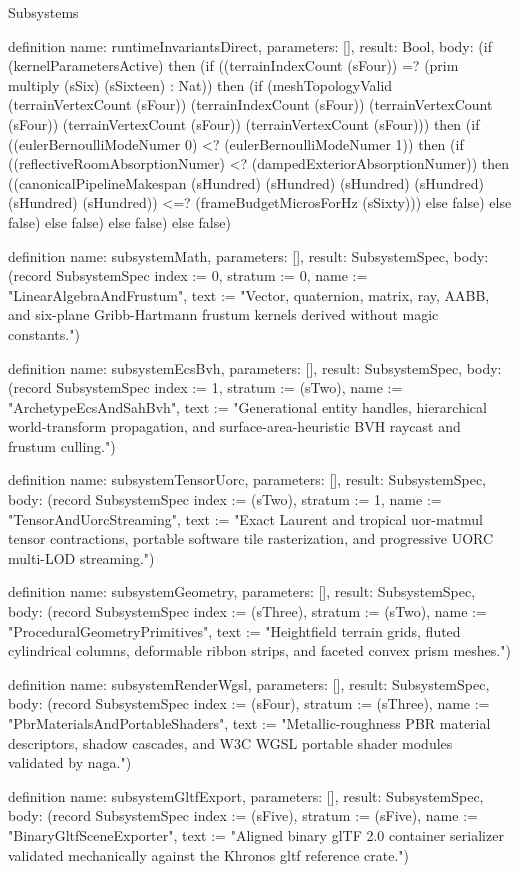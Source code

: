 \begin{lexlean}{Subsystems}
\begin{semanticmodule}
definition{
  name: runtimeInvariantsDirect,
  parameters: [],
  result: Bool,
  body: (if (kernelParametersActive) then (if ((terrainIndexCount (sFour)) =? (prim multiply (sSix) (sSixteen) : Nat)) then (if (meshTopologyValid (terrainVertexCount (sFour)) (terrainIndexCount (sFour)) (terrainVertexCount (sFour)) (terrainVertexCount (sFour)) (terrainVertexCount (sFour))) then (if ((eulerBernoulliModeNumer 0) <? (eulerBernoulliModeNumer 1)) then (if ((reflectiveRoomAbsorptionNumer) <? (dampedExteriorAbsorptionNumer)) then ((canonicalPipelineMakespan (sHundred) (sHundred) (sHundred) (sHundred) (sHundred) (sHundred)) <=? (frameBudgetMicrosForHz (sSixty))) else false) else false) else false) else false) else false)
}

definition{
  name: subsystemMath,
  parameters: [],
  result: SubsystemSpec,
  body: (record SubsystemSpec {index := 0, stratum := 0, name := "LinearAlgebraAndFrustum", text := "Vector, quaternion, matrix, ray, AABB, and six-plane Gribb-Hartmann frustum kernels derived without magic constants."})
}

definition{
  name: subsystemEcsBvh,
  parameters: [],
  result: SubsystemSpec,
  body: (record SubsystemSpec {index := 1, stratum := (sTwo), name := "ArchetypeEcsAndSahBvh", text := "Generational entity handles, hierarchical world-transform propagation, and surface-area-heuristic BVH raycast and frustum culling."})
}

definition{
  name: subsystemTensorUorc,
  parameters: [],
  result: SubsystemSpec,
  body: (record SubsystemSpec {index := (sTwo), stratum := 1, name := "TensorAndUorcStreaming", text := "Exact Laurent and tropical uor-matmul tensor contractions, portable software tile rasterization, and progressive UORC multi-LOD streaming."})
}

definition{
  name: subsystemGeometry,
  parameters: [],
  result: SubsystemSpec,
  body: (record SubsystemSpec {index := (sThree), stratum := (sTwo), name := "ProceduralGeometryPrimitives", text := "Heightfield terrain grids, fluted cylindrical columns, deformable ribbon strips, and faceted convex prism meshes."})
}

definition{
  name: subsystemRenderWgsl,
  parameters: [],
  result: SubsystemSpec,
  body: (record SubsystemSpec {index := (sFour), stratum := (sThree), name := "PbrMaterialsAndPortableShaders", text := "Metallic-roughness PBR material descriptors, shadow cascades, and W3C WGSL portable shader modules validated by naga."})
}

definition{
  name: subsystemGltfExport,
  parameters: [],
  result: SubsystemSpec,
  body: (record SubsystemSpec {index := (sFive), stratum := (sFive), name := "BinaryGltfSceneExporter", text := "Aligned binary glTF 2.0 container serializer validated mechanically against the Khronos gltf reference crate."})
}


\end{semanticmodule}
\end{lexlean}
